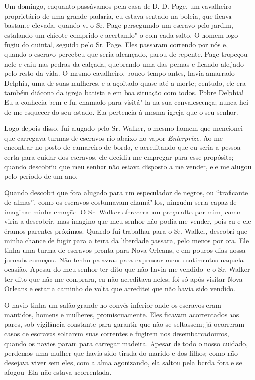 Um domingo, enquanto passávamos pela casa de D. D. Page, um cavalheiro
proprietário de uma grande padaria, eu estava sentado na boleia, que
ficava bastante elevada, quando vi o Sr. Page perseguindo um escravo
pelo jardim, estalando um chicote comprido e acertando"-o com cada salto.
O homem logo fugiu do quintal, seguido pelo Sr. Page. Eles passaram
correndo por nós e, quando o escravo percebeu que seria alcançado, parou
de repente. Page tropeçou nele e caiu nas pedras da calçada, quebrando
uma das pernas e ficando aleijado pelo resto da vida. O mesmo
cavalheiro, pouco tempo antes, havia amarrado Delphia, uma de suas
mulheres, e a açoitado quase até a morte; contudo, ele era também
diácono da igreja batista e em boa situação com todos. Pobre Delphia! Eu
a conhecia bem e fui chamado para visitá"-la na sua convalescença; nunca
hei de me esquecer do seu estado. Ela pertencia à mesma igreja que o seu
senhor.

Logo depois disso, fui alugado pelo Sr. Walker, o mesmo homem que
mencionei que carregava turmas de escravos rio abaixo no vapor
\emph{Enterprize}. Ao me encontrar no posto de camareiro de bordo, e
acreditando que eu seria a pessoa certa para cuidar dos escravos, ele
decidiu me empregar para esse propósito; quando descobriu que meu senhor
não estava disposto a me vender, ele me alugou pelo período de um ano.

Quando descobri que fora alugado para um especulador de negros, ou
``traficante de almas'', como os escravos costumavam chamá"-los, ninguém
seria capaz de imaginar minha emoção. O Sr. Walker oferecera um preço
alto por mim, como viria a descobrir, mas imagino que meu senhor não
podia me vender, pois eu e ele éramos parentes próximos. Quando fui
trabalhar para o Sr. Walker, descobri que minha chance de fugir para a
terra da liberdade passara, pelo menos por ora. Ele tinha uma turma de
escravos pronta para Nova Orleans, e em poucos dias nossa jornada
começou. Não tenho palavras para expressar meus sentimentos naquela
ocasião. Apesar do meu senhor ter dito que não havia me vendido, e o Sr.
Walker ter dito que não me comprara, eu não acreditava neles; foi só
após visitar Nova Orleans e estar a caminho de volta que acreditei que
não havia sido vendido.

O navio tinha um salão grande no convés inferior onde os escravos eram
mantidos, homens e mulheres, promiscuamente. Eles ficavam acorrentados
aos pares, sob vigilância constante para garantir que não se soltassem;
já ocorreram casos de escravos soltarem suas correntes e fugirem nos
desembarcadouros, quando os navios param para carregar madeira. Apesar
de todo o nosso cuidado, perdemos uma mulher que havia sido tirada do
marido e dos filhos; como não desejava viver sem eles, com a alma
agonizando, ela saltou pela borda fora e se afogou. Ela não estava
acorrentada.

